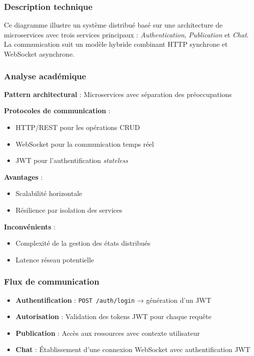 \documentclass{rapportPfe}
\begin{document}
\subsubsection*{Description technique}

Ce diagramme illustre un système distribué basé sur une architecture de microservices avec trois services principaux : \textit{Authentication}, \textit{Publication} et \textit{Chat}. La communication suit un modèle hybride combinant HTTP synchrone et WebSocket asynchrone.

\subsubsection*{Analyse académique}

\textbf{Pattern architectural} : Microservices avec séparation des préoccupations

\textbf{Protocoles de communication} :
\begin{itemize}[label=--]
    \item HTTP/REST pour les opérations CRUD
    \item WebSocket pour la communication temps réel
    \item JWT pour l'authentification \textit{stateless}
\end{itemize}

\textbf{Avantages} :
\begin{itemize}[label=+]
    \item Scalabilité horizontale
    \item Résilience par isolation des services
\end{itemize}

\textbf{Inconvénients} :
\begin{itemize}[label=-]
    \item Complexité de la gestion des états distribués
    \item Latence réseau potentielle
\end{itemize}

\subsubsection*{Flux de communication}

\begin{itemize}
    \item \textbf{Authentification} : \texttt{POST /auth/login} → génération d'un JWT
    \item \textbf{Autorisation} : Validation des tokens JWT pour chaque requête
    \item \textbf{Publication} : Accès aux ressources avec contexte utilisateur
    \item \textbf{Chat} : Établissement d’une connexion WebSocket avec authentification JWT
\end{itemize}
\end{document}
